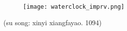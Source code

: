 \documentclass[12pt,a4paper,british,landscape]{article}
\begin{document}
\begin{figure}[h]
    \vspace{0.15cm}
    \begin{center}
        \texttt{[image: waterclock\_imprv.png]}
    \end{center}
\end{figure}

\begin{center}
    (su song: xinyi xiangfayao. 1094)
\end{center}
\end{document}
